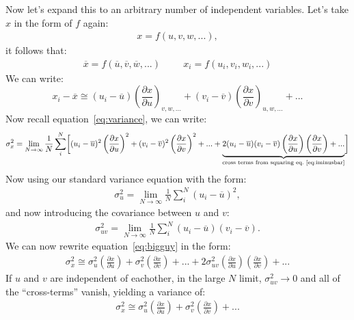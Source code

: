 \documentclass{article}
\begin{document}
\noindent Now let's expand this to an arbitrary number of independent variables. Let's take $x$ in the form of $f$ again:
\begin{align}
  x = f(u,v,w,...),
\end{align}
it follows that:
\begin{align}
  \overline{x} = f(\overline{u},\overline{v},\overline{w},...) \hspace{1cm} x_i = f(u_i,v_i,w_i,...)
\end{align}
We can write:
\begin{dmath}
  x_i - \overline{x} \cong (u_i - \overline{u})\left(\frac{\partial x}{\partial u}\right)_{v,w,...} + (v_i - \overline{v})\left(\frac{\partial x}{\partial v}\right)_{u,w,...} + ...
  \label{eq:iminusbar}
\end{dmath}
Now recall equation~\ref{eq:variance}, we can write:
\begin{dmath}
  \sigma_x^2 = \lim_{N\rightarrow\infty}\frac{1}{N}\sum_i^N\biggl[(u_i - \overline{u})^2\left(\frac{\partial x}{\partial u}\right)^2 + (v_i -\overline{v})^2\left(\frac{\partial x}{\partial v}\right)^2 + ... + \underbrace{2(u_i - \overline{u})(v_i - \overline{v})\left(\frac{\partial x}{\partial u}\right)\left(\frac{\partial x}{\partial v}\right)+...}_{\text{cross terms from squaring eq.~\ref{eq:iminusbar}}}\biggr]
  \label{eq:bigguy}
\end{dmath}
Now using our standard variance equation with the form:
\begin{align}
  \sigma_u^2 = \lim_{N\rightarrow\infty}\frac{1}{N}\sum_i^N (u_i - \overline{u})^2,
\end{align}
and now introducing the covariance between $u$ and $v$:
\begin{align}
  \sigma_{uv}^2 = \lim_{N\rightarrow\infty}\frac{1}{N}\sum_i^N (u_i - \overline{u})(v_i - \overline{v}).
  \label{eq:covariance}
\end{align}
We can now rewrite equation~\ref{eq:bigguy} in the form:
\begin{align}
  \sigma_x^2 \cong \sigma_u^2\left(\frac{\partial x}{\partial u}\right) + \sigma_v^2\left(\frac{\partial x}{\partial v}\right) + ... + 2\sigma_{uv}^2\left(\frac{\partial x}{\partial u}\right)\left(\frac{\partial x}{\partial v}\right) + ... 
\end{align}
If $u$ and $v$ are independent of eachother, in the large $N$ limit, $\sigma_{uv}^2 \rightarrow 0$ and all of the ``cross-terms'' vanish, yielding a variance of:
\begin{align}
  \sigma_x^2 \cong \sigma_u^2\left(\frac{\partial x}{\partial u}\right) + \sigma_v^2\left(\frac{\partial x}{\partial v}\right) + ...
\end{align}
\end{document}
